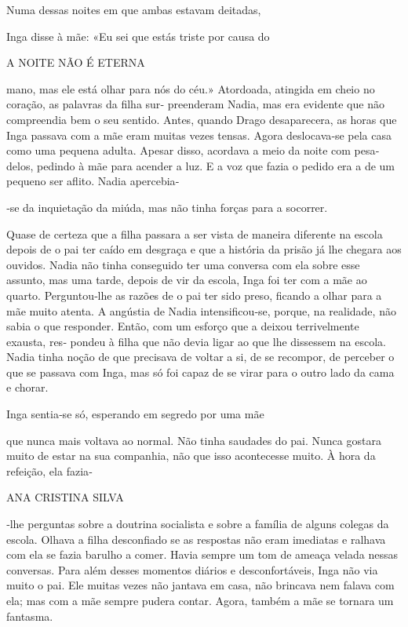 Numa dessas noites em que ambas estavam deitadas,

Inga disse à mãe: «Eu sei que estás triste por causa do

A NOITE NÃO É ETERNA

mano, mas ele está olhar para nós do céu.» Atordoada, atingida em cheio
no coração, as palavras da filha sur‑ preenderam Nadia, mas era evidente
que não compreendia bem o seu sentido. Antes, quando Drago desaparecera,
as horas que Inga passava com a mãe eram muitas vezes tensas. Agora
deslocava‑se pela casa como uma pequena adulta. Apesar disso, acordava a
meio da noite com pesa‑ delos, pedindo à mãe para acender a luz. E a voz
que fazia o pedido era a de um pequeno ser aflito. Nadia apercebia‑

‑se da inquietação da miúda, mas não tinha forças para a socorrer.

Quase de certeza que a filha passara a ser vista de maneira diferente na
escola depois de o pai ter caído em desgraça e que a história da prisão
já lhe chegara aos ouvidos. Nadia não tinha conseguido ter uma conversa
com ela sobre esse assunto, mas uma tarde, depois de vir da escola, Inga
foi ter com a mãe ao quarto. Perguntou‑lhe as razões de o pai ter sido
preso, ficando a olhar para a mãe muito atenta. A angústia de Nadia
intensificou‑se, porque, na realidade, não sabia o que responder. Então,
com um esforço que a deixou terrivelmente exausta, res‑ pondeu à filha
que não devia ligar ao que lhe dissessem na escola. Nadia tinha noção de
que precisava de voltar a si, de se recompor, de perceber o que se
passava com Inga, mas só foi capaz de se virar para o outro lado da cama
e chorar.

Inga sentia‑se só, esperando em segredo por uma mãe

que nunca mais voltava ao normal. Não tinha saudades do pai. Nunca
gostara muito de estar na sua companhia, não que isso acontecesse muito.
À hora da refeição, ela fazia‑

ANA CRISTINA SILVA

‑lhe perguntas sobre a doutrina socialista e sobre a família de alguns
colegas da escola. Olhava a filha desconfiado se as respostas não eram
imediatas e ralhava com ela se fazia barulho a comer. Havia sempre um
tom de ameaça velada nessas conversas. Para além desses momentos diários
e desconfortáveis, Inga não via muito o pai. Ele muitas vezes não
jantava em casa, não brincava nem falava com ela; mas com a mãe sempre
pudera contar. Agora, também a mãe se tornara um fantasma.

